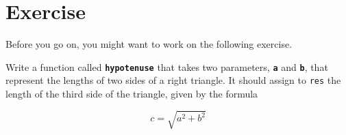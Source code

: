 \section{Exercise}

Before you go on, you might want to work on the following exercise.

\begin{ex}
\label{hypotenuse_exercise}
Write a function called \textbf{\lstinline{hypotenuse}} that takes two parameters, \textbf{\lstinline{a}} and \textbf{\lstinline{b}}, that represent the lengths of two sides of a right triangle.  It should assign to \lstinline{res} the length of the third side of the triangle, given by the formula

\[ c = \sqrt{a^2 + b^2} \]

\end{ex}
